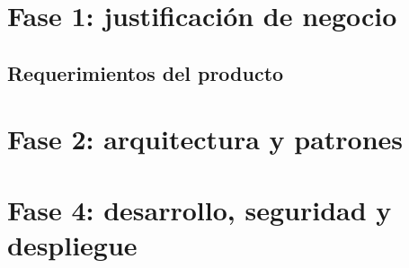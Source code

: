 \documentclass[12pt,oneside]{report}
\begin{document}



\tableofcontents
\listoffigures
\listoftables
\cleardoublepage
{}



\chapter{Fase 1: justificación de negocio}\label{cap:fase1}

\section{Requerimientos del producto}


\chapter{Fase 2: arquitectura y patrones}\label{cap:fase2}




\chapter{Fase 4: desarrollo, seguridad y despliegue}\label{cap:fase4}





\printbibliography[heading=bibintoc,title={Referencias}]
\nocite{*}

\appendix

\end{document}
